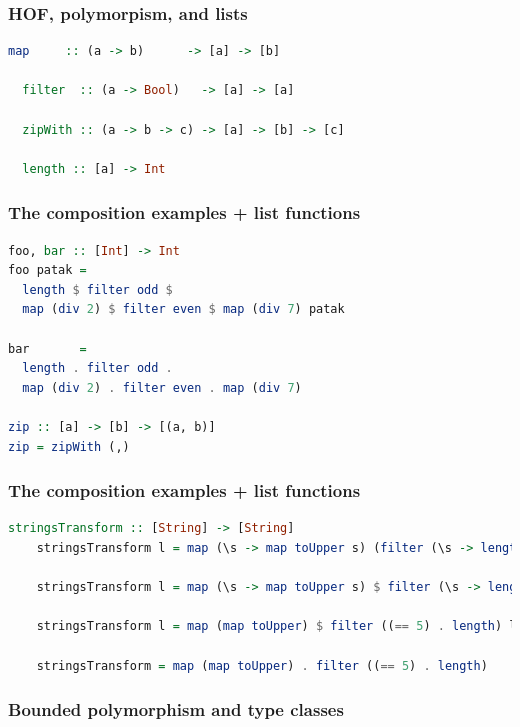 \documentclass[10pt,pdf,utf8,russian,aspectratio=169]{beamer}
\begin{document}
\begin{frame}[fragile]
  \frametitle{HOF, polymorpism, and lists}

  \begin{lstlisting}[language=Haskell]
  map     :: (a -> b)      -> [a] -> [b]

  filter  :: (a -> Bool)   -> [a] -> [a]

  zipWith :: (a -> b -> c) -> [a] -> [b] -> [c]

  length :: [a] -> Int
  \end{lstlisting}

\vspace{\baselineskip}

\end{frame}

\begin{frame}[fragile]
    \frametitle{The composition examples + list functions}
\begin{lstlisting}[language=Haskell]
foo, bar :: [Int] -> Int
foo patak =
  length $ filter odd $
  map (div 2) $ filter even $ map (div 7) patak

bar       =
  length . filter odd .
  map (div 2) . filter even . map (div 7)

zip :: [a] -> [b] -> [(a, b)]
zip = zipWith (,)
\end{lstlisting}
\end{frame}

\begin{frame}[fragile]
    \frametitle{The composition examples + list functions}
    \begin{lstlisting}[language=Haskell]
    stringsTransform :: [String] -> [String]
    stringsTransform l = map (\s -> map toUpper s) (filter (\s -> length s == 5) l)

    stringsTransform l = map (\s -> map toUpper s) $ filter (\s -> length s == 5) l

    stringsTransform l = map (map toUpper) $ filter ((== 5) . length) l

    stringsTransform = map (map toUpper) . filter ((== 5) . length)
    \end{lstlisting}
\end{frame}

\begin{frame}
  \frametitle{Bounded polymorphism and type classes}


\end{frame}
\end{document}
